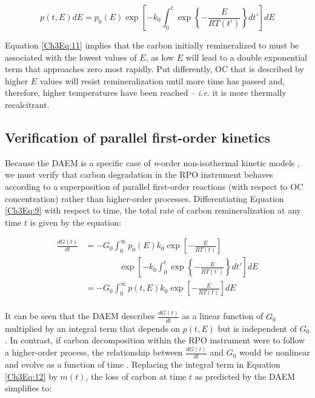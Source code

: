 \begin{equation}\label{Ch3Eq:11}
	p(t,E) dE = p_{0}(E) \exp \left[ - k_{0} \int_{0}^{t} \exp \left\{ - \frac{E}{RT(t')} \right\} dt' \right] dE
\end{equation}

Equation \ref{Ch3Eq:11} implies that the carbon initially remineralized to  must be associated with the lowest values of $E$, as low $E$ will lead to a double exponential term that approaches zero most rapidly. Put differently, OC that is described by higher $E$ values will resist remineralization until more time has passed and, therefore, higher temperatures have been reached -- \textit{i.e.} it is more thermally recalcitrant.

\subsection{Verification of parallel first-order kinetics}

Because the DAEM is a specific case of \textit{n}-order non-isothermal kinetic models \citep{Braun:1987vf,White:2011iz}, we must verify that carbon degradation in the RPO instrument behaves according to a superposition of parallel first-order reactions (with respect to OC concentration) rather than higher-order processes. Differentiating Equation \ref{Ch3Eq:9} with respect to time, the total rate of carbon remineralization at any time $t$ is given by the equation:

\begin{equation} \label{Ch3Eq:12}
	\begin{split}
	\frac{dG(t)}{dt}  & = - G_{0} \int_{0}^{\infty} p_{0}(E) k_{0} \exp \left[ - \frac{E}{RT(t)} \right] \\
		& \qquad\qquad \exp \left[ - k_{0} \int_{0}^{t} \exp \left\{ - \frac{E}{RT(t')} \right\} dt' \right] dE \\
	& = - G_{0} \int_{0}^{\infty} p(t, E) k_{0} \exp \left[ - \frac{E}{RT(t)} \right] dE \\
	\end{split}
\end{equation}
	
It can be seen that the DAEM describes $\frac{dG(t)}{dt}$ as a linear function of $G_{0}$ multiplied by an integral term that depends on $p(t,E)$ but is independent of $G_{0}$. In contrast, if carbon decomposition within the RPO instrument were to follow a higher-order process, the relationship between $\frac{dG(t)}{dt}$ and $G_{0}$ would be nonlinear and evolve as a function of time \citep[\textit{e.g.}][]{Follett:2014if}. Replacing the integral term in Equation \ref{Ch3Eq:12} by $m(t)$, the loss of carbon at time $t$ as predicted by the DAEM simplifies to:

